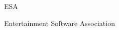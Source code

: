 \documentclass[tg]{mdtuffs}
\begin{document}
\begin{listofabbrv}{ESA}
\item [ESA] Entertainment Software Association    
    
\end{listofabbrv}



\tableofcontents


\setlength{\baselineskip}{1.5\baselineskip}





\setlength{\baselineskip}{\baselineskip}

%





%
%

%
\end{document}
